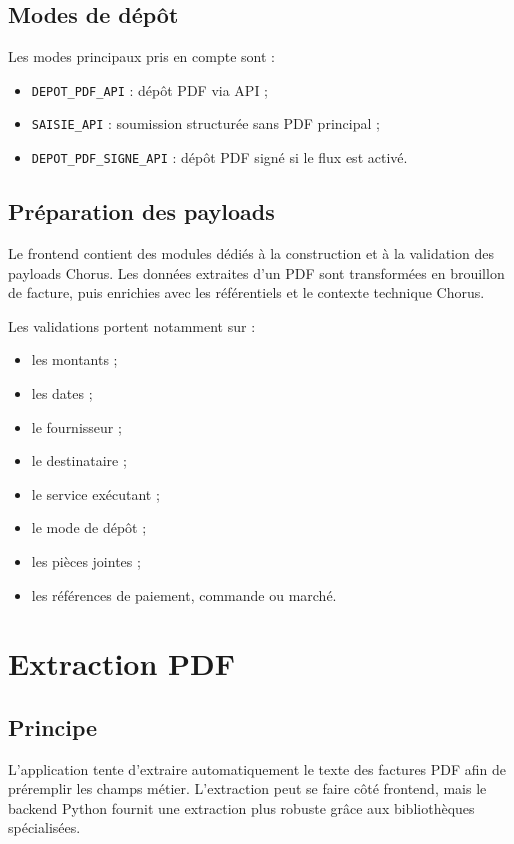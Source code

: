 \documentclass[11pt,a4paper]{article}
\begin{document}
\subsection{Modes de dépôt}

Les modes principaux pris en compte sont :

\begin{itemize}
  \item \texttt{DEPOT\_PDF\_API} : dépôt PDF via API ;
  \item \texttt{SAISIE\_API} : soumission structurée sans PDF principal ;
  \item \texttt{DEPOT\_PDF\_SIGNE\_API} : dépôt PDF signé si le flux est activé.
\end{itemize}

\subsection{Préparation des payloads}

Le frontend contient des modules dédiés à la construction et à la validation des
payloads Chorus. Les données extraites d'un PDF sont transformées en brouillon de
facture, puis enrichies avec les référentiels et le contexte technique Chorus.

Les validations portent notamment sur :

\begin{itemize}
  \item les montants ;
  \item les dates ;
  \item le fournisseur ;
  \item le destinataire ;
  \item le service exécutant ;
  \item le mode de dépôt ;
  \item les pièces jointes ;
  \item les références de paiement, commande ou marché.
\end{itemize}

\section{Extraction PDF}

\subsection{Principe}

L'application tente d'extraire automatiquement le texte des factures PDF afin de
préremplir les champs métier. L'extraction peut se faire côté frontend, mais le
backend Python fournit une extraction plus robuste grâce aux bibliothèques
spécialisées.
\end{document}
